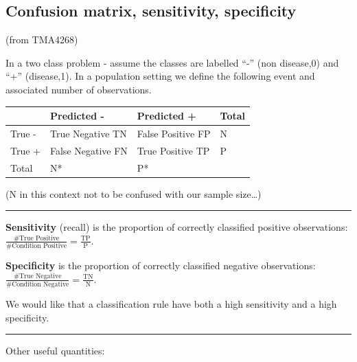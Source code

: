 \documentclass[
  letterpaper,
  DIV=11,
  numbers=noendperiod]{scrartcl}
\begin{document}
\hypertarget{confusion-matrix-sensitivity-specificity}{%
\subsection{Confusion matrix, sensitivity,
specificity}\label{confusion-matrix-sensitivity-specificity}}

(from TMA4268)

In a two class problem - assume the classes are labelled ``-'' (non
disease,0) and ``+'' (disease,1). In a population setting we define the
following event and associated number of observations.

\begin{longtable}[]{@{}llll@{}}
\toprule()
& Predicted - & Predicted + & Total \\
\midrule()
\endhead
True - & True Negative TN & False Positive FP & N \\
True + & False Negative FN & True Positive TP & P \\
Total & N* & P* & \\
\bottomrule()
\end{longtable}

(N in this context not to be confused with our sample size\ldots)

\begin{center}\rule{0.5\linewidth}{0.5pt}\end{center}

\textbf{Sensitivity} (recall) is the proportion of correctly classified
positive observations:
\(\frac{\# \text{True Positive}}{\# \text{Condition Positive}}=\frac{\text{TP}}{\text{P}}\).

\textbf{Specificity} is the proportion of correctly classified negative
observations:
\(\frac{\# \text{True Negative}}{\# \text{Condition Negative}}=\frac{\text{TN}}{\text{N}}\).

We would like that a classification rule have both a high sensitivity
and a high specificity.

\begin{center}\rule{0.5\linewidth}{0.5pt}\end{center}

Other useful quantities:
\end{document}
